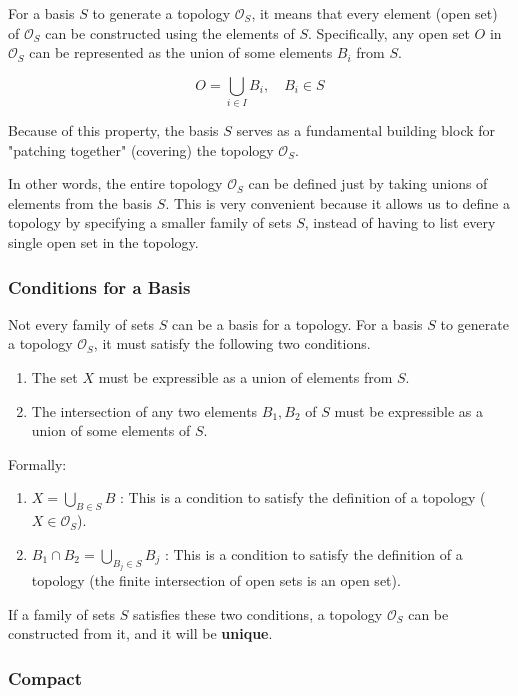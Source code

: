 \documentclass{article}
\begin{document}
For a basis $S$ to generate a topology $\mathcal{O}_S$, it means that every element (open set) of $\mathcal{O}_S$ can be constructed using the elements of $S$.
Specifically, any open set $O$ in $\mathcal{O}_S$ can be represented as the union of some elements $B_i$ from $S$.

$$O = \bigcup_{i \in I} B_i, \quad B_i \in S$$

Because of this property, the basis $S$ serves as a fundamental building block for "patching together" (covering) the topology $\mathcal{O}_S$.

In other words, the entire topology $\mathcal{O}_S$ can be defined just by taking unions of elements from the basis $S$.
This is very convenient because it allows us to define a topology by specifying a smaller family of sets $S$, instead of having to list every single open set in the topology.

\subsubsection{Conditions for a Basis}

Not every family of sets $S$ can be a basis for a topology.
For a basis $S$ to generate a topology $\mathcal{O}_S$, it must satisfy the following two conditions.

\begin{enumerate}
	\item The set $X$ must be expressible as a union of elements from $S$.
	\item The intersection of any two elements $B_1, B_2$ of $S$ must be expressible as a union of some elements of $S$.
\end{enumerate}

Formally:

\begin{enumerate}
	\item $X = \bigcup_{B \in S} B$ : This is a condition to satisfy the definition of a topology ($X \in \mathcal{O}_S$).
	\item $B_1 \cap B_2 = \bigcup_{B_j \in S} B_j$ : This is a condition to satisfy the definition of a topology (the finite intersection of open sets is an open set).
\end{enumerate}

If a family of sets $S$ satisfies these two conditions, a topology $\mathcal{O}_S$ can be constructed from it, and it will be \textbf{unique}.

\subsubsection{Compact}
\end{document}
